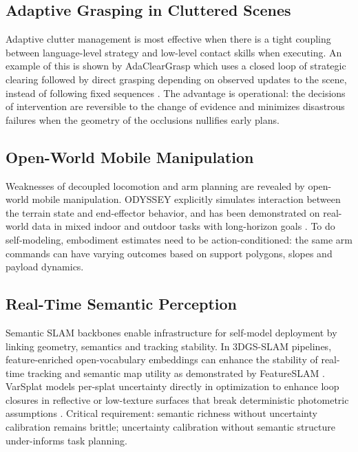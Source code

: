 \documentclass[11pt,a4paper]{article}
\begin{document}
\subsection{Adaptive Grasping in Cluttered Scenes}

Adaptive clutter management is most effective when there is a tight coupling between language-level strategy and low-level contact skills when executing. An example of this is shown by AdaClearGrasp which uses a closed loop of strategic clearing followed by direct grasping depending on observed updates to the scene, instead of following fixed sequences \cite{chen2026adacleargrasp}. The advantage is operational: the decisions of intervention are reversible to the change of evidence and minimizes disastrous failures when the geometry of the occlusions nullifies early plans.

\subsection{Open-World Mobile Manipulation}

Weaknesses of decoupled locomotion and arm planning are revealed by open-world mobile manipulation. ODYSSEY explicitly simulates interaction between the terrain state and end-effector behavior, and has been demonstrated on real-world data in mixed indoor and outdoor tasks with long-horizon goals \cite{wang2025odyssey}. To do self-modeling, embodiment estimates need to be action-conditioned: the same arm commands can have varying outcomes based on support polygons, slopes and payload dynamics.

\subsection{Real-Time Semantic Perception}

Semantic SLAM backbones enable infrastructure for self-model deployment by linking geometry, semantics and tracking stability. In 3DGS-SLAM pipelines, feature-enriched open-vocabulary embeddings can enhance the stability of real-time tracking and semantic map utility as demonstrated by FeatureSLAM \cite{thirgood2025featureslam}. VarSplat models per-splat uncertainty directly in optimization to enhance loop closures in reflective or low-texture surfaces that break deterministic photometric assumptions \cite{tran2025varsplat}. Critical requirement: semantic richness without uncertainty calibration remains brittle; uncertainty calibration without semantic structure under-informs task planning.
\end{document}
